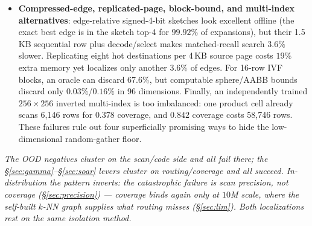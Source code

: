 \documentclass{article}
\begin{document}
\begin{itemize}
    query-vector evaluations --- over three centroid-router budgets. Co-retrieval
    shortcuts touch only 2.95M of 10M base nodes: replacing eight of 32 geometric
    edges collapses recall, while retaining all 32 and adding eight reaches
    $0.9022$@$6233$ QPS versus $0.9039$@$6282$ without them. A conditional
    set-cover reranker adds only $0.0031$ held-out coverage, and graph-neighbour
    votes used to launch a second IVF scan lose $24$--$45\%$ throughput for
    $0.01$--$0.02$ recall. The signal is real; its indexing and selection cost
    exceeds the saved scan.
  \item \textbf{Compressed-edge, replicated-page, block-bound, and multi-index
    alternatives}: edge-relative signed-4-bit sketches look excellent offline
    (the exact best edge is in the sketch top-4 for $99.92\%$ of expansions), but
    their 1.5\,KB sequential row plus decode/select makes matched-recall search
    $3.6\%$ slower. Replicating eight hot destinations per 4\,KB source page costs
    $19\%$ extra memory yet localizes only another $3.6\%$ of edges. For 16-row
    IVF blocks, an oracle can discard $67.6\%$, but computable sphere/AABB bounds
    discard only $0.03\%$/$0.16\%$ in 96 dimensions. Finally, an independently
    trained $256{\times}256$ inverted multi-index is too imbalanced: one product
    cell already scans 6,146 rows for $0.378$ coverage, and $0.842$ coverage costs
    58,746 rows. These failures rule out four superficially promising ways to
    hide the low-dimensional random-gather floor.
\end{itemize}
\emph{The OOD negatives cluster on the scan/code side and all fail there; the
\S\ref{sec:gamma}--\S\ref{sec:soar} levers cluster on routing/coverage and all succeed. In-distribution the
pattern inverts: the catastrophic failure is scan precision, not coverage
(\S\ref{sec:precision}) --- coverage binds again only at $10$M scale, where the
self-built $k$-NN graph supplies what routing misses (\S\ref{sec:lim}). Both localizations rest on the same isolation method.}
\end{document}

